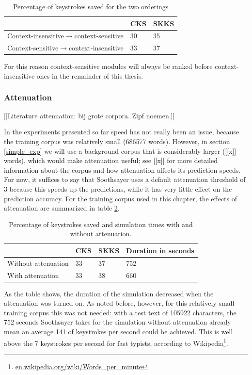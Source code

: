 \documentclass[12pt]{article}
\begin{document}
\begin{table}[h]
\begin{tabular}{l|ll} 
&CKS&SKKS\\
\hline
Context-insensitive$\rightarrow$context-sensitive&30&35\\
Context-sensitive$\rightarrow$context-insensitive&33&37\\
\end{tabular} 
\caption{Percentage of keystrokes saved for the two orderings} \label{results_concat}
\end{table}

For this reason context-sensitive modules will always be ranked before context-insensitive ones in the remainder of this thesis.

\subsubsection{Attenuation}

[[Literature attenuation: bij grote corpora. Zipf noemen.]]

In the experiments presented so far speed has not really been an issue, because the training corpus was relatively small (686577 words). However, in section \ref{simple_exp} we will use a background corpus that is considerably larger ([[x]] words), which would make attenuation useful; see [[x]] for more detailed information about the corpus and how attenuation affects its prediction speeds. For now, it suffices to say that Soothsayer uses a default attenuation threshold of 3 because this speeds up the predictions, while it has very little effect on the prediction accuracy. For the training corpus used in this chapter, the effects of attenuation are summarized in table \ref{results_att}.

\begin{table}[h]
\begin{tabular}{l|lll} 

&CKS&SKKS&Duration in seconds\\
\hline
Without attenuation&33&37&752\\
With attenuation&33&38&660\\
\end{tabular} 
\caption{Percentage of keystrokes saved and simulation times with and without attenuation.} \label{results_att}
\end{table}

As the table shows, the duration of the simulation decreased when the attenuation was turned on. As noted before, however, for this relatively small training corpus this was not needed: with a test text of 105922 characters, the 752 seconds Soothsayer takes for the simulation without attenuation already mean an average 141 of keystrokes per second could be achieved. This is well above the 7 keystrokes per second for fast typists, according to Wikipedia\footnote{\url{en.wikipedia.org/wiki/Words\_per\_minute}}.
\end{document}
